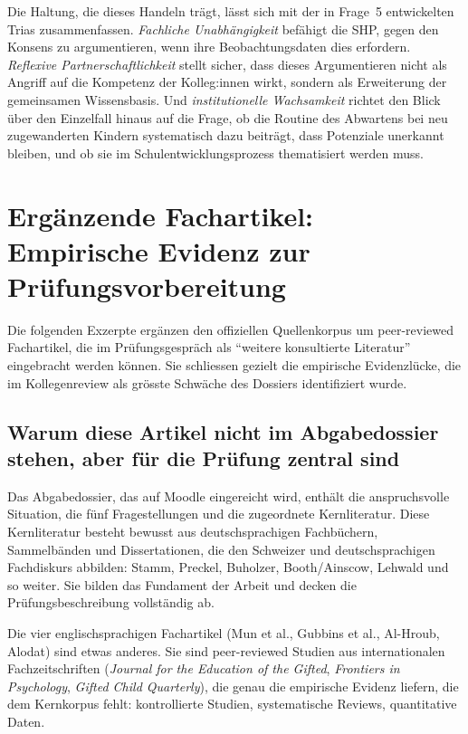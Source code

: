 \documentclass[ngerman, a4paper]{article}
\begin{document}
Die Haltung, die dieses Handeln trägt, lässt sich mit der in Frage~5
entwickelten Trias zusammenfassen. \textit{Fachliche Unabhängigkeit} befähigt
die SHP, gegen den Konsens zu argumentieren, wenn ihre Beobachtungsdaten dies
erfordern. \textit{Reflexive Partnerschaftlichkeit} stellt sicher, dass dieses
Argumentieren nicht als Angriff auf die Kompetenz der Kolleg:innen wirkt,
sondern als Erweiterung der gemeinsamen Wissensbasis. Und
\textit{institutionelle Wachsamkeit} richtet den Blick über den Einzelfall
hinaus auf die Frage, ob die Routine des Abwartens bei neu zugewanderten
Kindern systematisch dazu beiträgt, dass Potenziale unerkannt bleiben, und
ob sie im Schulentwicklungsprozess thematisiert werden muss.


\newpage
\section*{Ergänzende Fachartikel: Empirische Evidenz zur Prüfungsvorbereitung}
\label{sec:fachartikel}

Die folgenden Exzerpte ergänzen den offiziellen Quellenkorpus um
peer-reviewed Fachartikel, die im Prüfungsgespräch als \enquote{weitere
konsultierte Literatur} eingebracht werden können. Sie schliessen gezielt
die empirische Evidenzlücke, die im Kollegenreview als grösste Schwäche
des Dossiers identifiziert wurde.

\subsection*{Warum diese Artikel nicht im Abgabedossier stehen, aber für die Prüfung zentral sind}

Das Abgabedossier, das auf Moodle eingereicht wird, enthält die anspruchsvolle Situation,
die fünf Fragestellungen und die zugeordnete Kernliteratur. Diese Kernliteratur besteht
bewusst aus deutschsprachigen Fachbüchern, Sammelbänden und Dissertationen, die den
Schweizer und deutschsprachigen Fachdiskurs abbilden: Stamm, Preckel, Buholzer,
Booth/Ainscow, Lehwald und so weiter. Sie bilden das Fundament der Arbeit und decken die
Prüfungsbeschreibung vollständig ab.

Die vier englischsprachigen Fachartikel (Mun et al., Gubbins et al., Al-Hroub, Alodat) sind
etwas anderes. Sie sind peer-reviewed Studien aus internationalen Fachzeitschriften
(\textit{Journal for the Education of the Gifted}, \textit{Frontiers in Psychology},
\textit{Gifted Child Quarterly}), die genau die empirische Evidenz liefern, die dem
Kernkorpus fehlt: kontrollierte Studien, systematische Reviews, quantitative Daten.
\end{document}
